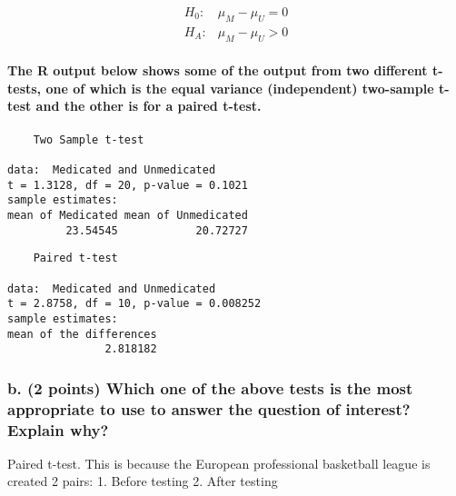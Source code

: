 \documentclass[
]{article}
\begin{document}
\begin{align*}
H_0:&\mu_M - \mu_U=0\\
H_A:&\mu_M - \mu_U> 0
\end{align*}

\hypertarget{the-r-output-below-shows-some-of-the-output-from-two-different-t-tests-one-of-which-is-the-equal-variance-independent-two-sample-t-test-and-the-other-is-for-a-paired-t-test.}{%
\paragraph{The R output below shows some of the output from two
different t-tests, one of which is the equal variance (independent)
two-sample t-test and the other is for a paired
t-test.}\label{the-r-output-below-shows-some-of-the-output-from-two-different-t-tests-one-of-which-is-the-equal-variance-independent-two-sample-t-test-and-the-other-is-for-a-paired-t-test.}}

\begin{verbatim}
    Two Sample t-test

data:  Medicated and Unmedicated
t = 1.3128, df = 20, p-value = 0.1021
sample estimates:
mean of Medicated mean of Unmedicated 
         23.54545            20.72727 
\end{verbatim}

\begin{verbatim}
    Paired t-test

data:  Medicated and Unmedicated
t = 2.8758, df = 10, p-value = 0.008252
sample estimates:
mean of the differences 
               2.818182 
\end{verbatim}

\hypertarget{b.-2-points-which-one-of-the-above-tests-is-the-most-appropriate-to-use-to-answer-the-question-of-interest-explain-why}{%
\subsubsection{b. (2 points) Which one of the above tests is the most
appropriate to use to answer the question of interest? Explain
why?}\label{b.-2-points-which-one-of-the-above-tests-is-the-most-appropriate-to-use-to-answer-the-question-of-interest-explain-why}}

Paired t-test. This is because the European professional basketball
league is created 2 pairs: 1. Before testing 2. After testing
\end{document}
